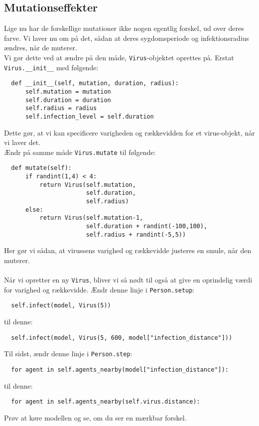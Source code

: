 \documentclass{article}
\begin{document}
\subsection{Mutationseffekter}
Lige nu har de forskellige mutationer ikke nogen egentlig forskel, ud over deres farve. Vi laver nu om på det, sådan at deres sygdomsperiode og infektionsradius ændres, når de muterer.\\
Vi gør dette ved at ændre på den måde, \texttt{Virus}-objektet oprettes på. Erstat \texttt{Virus.\_\_init\_\_} med følgende:
\begin{lstlisting}
  def __init__(self, mutation, duration, radius):
      self.mutation = mutation
      self.duration = duration
      self.radius = radius
      self.infection_level = self.duration
\end{lstlisting}
Dette gør, at vi kan specificere varigheden og rækkevidden for et virus-objekt, når vi laver det.\\
Ændr på samme måde \texttt{Virus.mutate} til følgende:
\begin{lstlisting}
  def mutate(self):
      if randint(1,4) < 4:
          return Virus(self.mutation,
                       self.duration,
                       self.radius)
      else:
          return Virus(self.mutation-1,
                       self.duration + randint(-100,100),
                       self.radius + randint(-5,5))
\end{lstlisting}
Her gør vi sådan, at virussens varighed og rækkevidde justeres en smule, når den muterer.\\\\
Når vi opretter en ny \texttt{Virus}, bliver vi så nødt til også at give en oprindelig værdi for varighed og rækkevidde. Ændr denne linje i \texttt{Person.setup}:
\begin{lstlisting}
  self.infect(model, Virus(5))
\end{lstlisting}
til denne:
\begin{lstlisting}
  self.infect(model, Virus(5, 600, model["infection_distance"]))
\end{lstlisting}
Til sidst, ændr denne linje i \texttt{Person.step}:
\begin{lstlisting}
  for agent in self.agents_nearby(model["infection_distance"]):
\end{lstlisting}
til denne:
\begin{lstlisting}
  for agent in self.agents_nearby(self.virus.distance):
\end{lstlisting}
Prøv at køre modellen og se, om du ser en mærkbar forskel.
\end{document}
